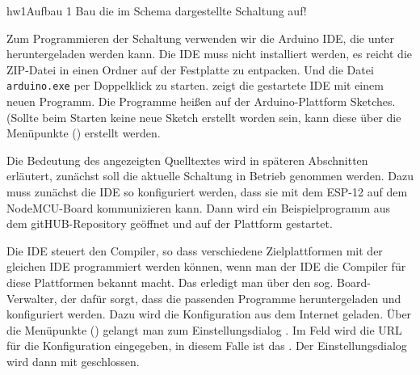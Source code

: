 \begin{multicols}{2}
\begin{excercise}{hw1}{Aufbau 1}
Bau die im Schema  dargestellte Schaltung auf!
\end{excercise}


\vfill\null\pagebreak
{}


Zum Programmieren der Schaltung verwenden wir die Arduino IDE, die unter  heruntergeladen werden kann.
Die IDE muss nicht installiert werden, es reicht die ZIP-Datei in einen Ordner auf der Festplatte zu entpacken.
Und die Datei \texttt{arduino.exe} per Doppelklick zu starten.
 zeigt die gestartete IDE mit einem neuen Programm. Die Programme heißen auf der Arduino-Plattform Sketches. (Sollte beim Starten keine neue
Sketch erstellt worden sein, kann diese über die Menüpunkte  () erstellt werden.

Die Bedeutung des angezeigten Quelltextes wird in späteren Abschnitten erläutert, zunächst soll die aktuelle Schaltung in Betrieb genommen werden. 
Dazu muss zunächst die IDE so konfiguriert werden, dass sie mit dem ESP-12 auf dem NodeMCU-Board kommunizieren kann. Dann wird ein Beispielprogramm 
aus dem gitHUB-Repository geöffnet und auf der Plattform gestartet.

\pagebreak{}
Die IDE steuert den Compiler, so dass verschiedene Zielplattformen mit der gleichen IDE programmiert werden können, wenn man der IDE die Compiler
für diese Plattformen bekannt macht. Das erledigt man über den sog. Board-Verwalter, der dafür sorgt, dass die passenden Programme heruntergeladen
und konfiguriert werden. Dazu wird die Konfiguration aus dem Internet geladen. Über die Menüpunkte  ()
gelangt man zum Einstellungsdialog . 
Im Feld  wird die URL für die Konfiguration eingegeben, in diesem Falle ist das 
. Der Einstellungsdialog wird dann mit  geschlossen.



\end{multicols}
